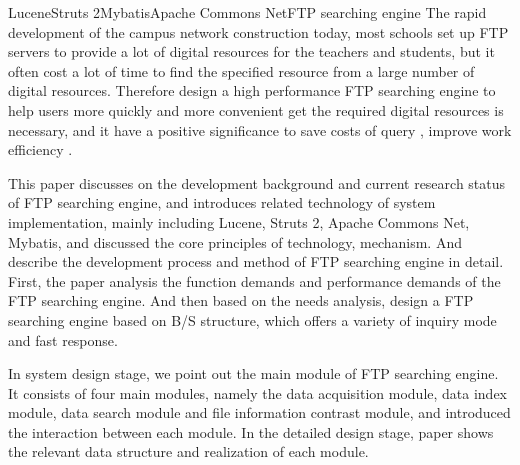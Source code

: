 
\begin{Eabstract}{Lucene}{Struts 2}{Mybatis}{Apache Commons Net}{FTP searching engine}
The rapid development of the campus network construction today, most schools set up FTP servers to provide a lot of digital resources for the teachers and students, but it often cost a lot of time to find the specified resource from a large number of digital resources. Therefore design a high performance FTP searching engine to help users more quickly and more convenient get the required digital resources is necessary, and it have a positive significance to save costs of query , improve work efficiency .

This paper discusses on the development background and current research status of FTP searching engine, and introduces related technology of system implementation, mainly including Lucene, Struts 2, Apache Commons Net, Mybatis, and discussed the core principles of technology, mechanism. And describe the development process and method of FTP searching engine in detail. First, the paper analysis the function demands and performance demands of the FTP searching engine. And then based on the needs analysis, design a FTP searching engine based on B/S structure, which offers a variety of inquiry mode and fast response.

In system design stage, we point out the main module of FTP searching engine. It consists of four main modules, namely the data acquisition module, data index module, data search module and file information contrast module, and introduced the interaction between each module. In the detailed design stage, paper shows the relevant data structure and realization of each module.
\end{Eabstract}
